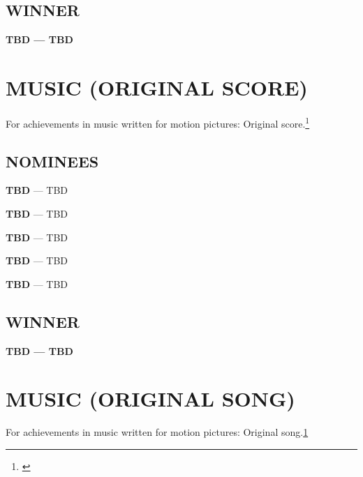 \documentclass[letterpaper]{extarticle}
\begin{document}
  \subsection*{{\selectfont WINNER}}
  \textcolor{oscaryellow}{\textbf{{\selectfont TBD} — TBD}}

  \section*{\textcolor{oscaryellow}{{\selectfont MUSIC (ORIGINAL SCORE)}}}
  \vspace{-6pt}
  {\selectfont For achievements in music written for motion pictures: Original score.\footnote{\label{first}{}}}
  \subsection*{{\selectfont NOMINEES}}
  \begin{multicols}{2}
    \begin{itemize}
      \begin{small}
        \item \textbf{{\selectfont TBD}} — TBD
        \item \textbf{{\selectfont TBD}} — TBD
        \item \textbf{{\selectfont TBD}} — TBD
        \item \textbf{{\selectfont TBD}} — TBD
        \item \textbf{{\selectfont TBD}} — TBD
      \end{small}
    \end{itemize}
  \end{multicols}

  \subsection*{{\selectfont WINNER}}
  \textcolor{oscaryellow}{\textbf{{\selectfont TBD} — TBD}}

  \section*{\textcolor{oscaryellow}{{\selectfont MUSIC (ORIGINAL SONG)}}}
  \vspace{-6pt}
  {\selectfont For achievements in music written for motion pictures: Original song.{\cref{first}}}
\end{document}
